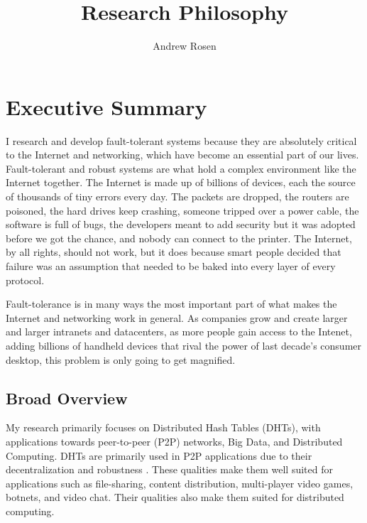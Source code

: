 \documentclass[letterpaper]{article}
\author{Andrew Rosen}
\title{Research Philosophy}
\date{}
\begin{document}
\maketitle



\section{Executive Summary}




I research and develop fault-tolerant systems because they are absolutely critical to the Internet and networking, which have become an essential part of our lives.
Fault-tolerant and robust systems are what hold a complex environment like the Internet together.
The Internet is made up of billions of devices, each the source of thousands of tiny errors every day.
The packets are dropped, the routers are poisoned, the hard drives keep crashing, someone tripped over a power cable, the software is full of bugs, the developers meant to add security but it was adopted before we got the chance, and nobody can connect to the printer.
The Internet, by all rights, should not work, but it does because smart people decided that failure was an assumption that needed to be baked into every layer of every protocol.

Fault-tolerance is in many ways the most important part of what makes the Internet and networking work in general.
As companies grow and create larger and larger intranets and datacenters, as more people gain access to the Intenet, adding billions of handheld devices that rival the power of last decade's consumer desktop, this problem is only going to get magnified.



\subsection{Broad Overview}

My research primarily focuses on Distributed Hash Tables (DHTs), with applications towards peer-to-peer (P2P) networks, Big Data, and Distributed Computing.
DHTs are primarily used in P2P applications due to their decentralization and robustness . 
These qualities make them well suited for applications such as file-sharing, content distribution, multi-player video games, botnets, and video chat.
Their qualities also make them suited for distributed computing.
\end{document}
